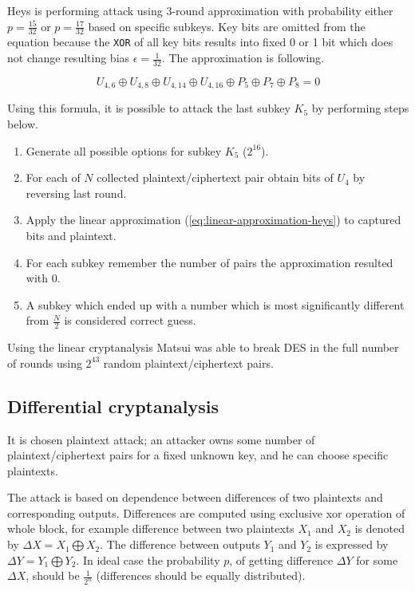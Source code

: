\documentclass[
    digital,    %
    oneside,    %
    color,
    11pt,
    nocover,
    notable,
    nolof,
    nolot,
    final
]{fithesis3}
\renewcommand\_{\textunderscore\allowbreak}
\begin{document}
\begin{description}
	Heys is performing attack using 3-round approximation with probability either $p = \frac{15}{32}$ or $p = \frac{17}{32}$ based on specific subkeys. Key bits are omitted from the equation because the \texttt{XOR} of all key bits results into fixed 0 or 1 bit which does not change resulting bias $\epsilon = \frac{1}{32}$. The approximation is following.                 
	
	\begin{equation}
	U_{4,6} \oplus U_{4,8} \oplus U_{4,14} \oplus U_{4,16} \oplus P_{5} \oplus P_{7} \oplus P_{8} = 0
	\label{eq:linear-approximation-heys}
	\end{equation}
	
	Using this formula, it is possible to attack the last subkey $K_5$ by performing steps below.
	
	\begin{enumerate}
		\item Generate all possible options for subkey $K_{5}$ ($2^{16}$).
		\item For each of $N$ collected plaintext/ciphertext pair obtain bits of $U_{4}$ by reversing last round. 
		\item Apply the linear approximation (\cref{eq:linear-approximation-heys}) to captured bits and plaintext.
		\item For each subkey remember the number of pairs the approximation resulted with 0.  
		\item A subkey which ended up with a number which is most significantly different from $\frac{N}{2}$ is considered correct guess.
	\end{enumerate}
\end{description}

Using the linear cryptanalysis Matsui \cite{matsuiAttack} was able to break DES in the full number of rounds using $2^{43}$ random plaintext/ciphertext pairs.

\subsection{Differential cryptanalysis}

It is chosen plaintext attack; an attacker owns some number of plaintext/ciphertext pairs for a fixed unknown key, and he can choose specific plaintexts. 

The attack is based on dependence between differences of two plaintexts and corresponding outputs. Differences are computed using exclusive xor operation of whole block, for example difference between two plaintexts $X_{1}$ and $X_{2}$ is denoted by $\Delta X = X_{1} \bigoplus X_{2}$. The difference between outputs $Y_{1}$ and $Y_{2}$ is expressed by $\Delta Y = Y_{1} \bigoplus Y_{2}$. In ideal case the probability $p$, of getting difference $\Delta Y$ for some  $\Delta X$, should be $\frac{1}{2^{n}}$ (differences should be equally distributed). 
\end{document}
